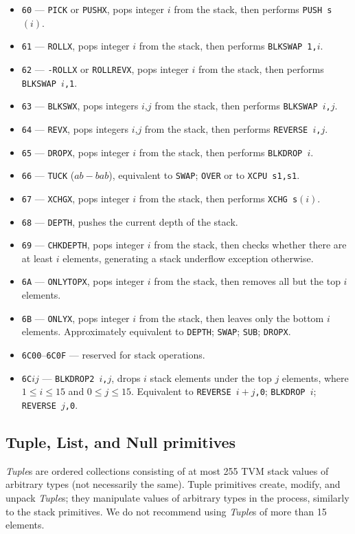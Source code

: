 \documentclass[12pt,oneside]{article}
\def\mysubsection#1{\subsection{#1}\fancyhead[C]{\small{\textsc{\textrm{\thesubsection.} #1}}}}
\begin{document}
\begin{itemize}
\item {\tt 60} --- {\tt PICK} or {\tt PUSHX}, pops integer $i$ from the stack, then performs {\tt PUSH s$(i)$}.
\item {\tt 61} --- {\tt ROLLX}, pops integer $i$ from the stack, then performs {\tt BLKSWAP 1,$i$}.
\item {\tt 62} --- {\tt -ROLLX} or {\tt ROLLREVX}, pops integer $i$ from the stack, then performs {\tt BLKSWAP $i$,1}.
\item {\tt 63} --- {\tt BLKSWX}, pops integers $i$,$j$ from the stack, then performs {\tt BLKSWAP $i$,$j$}.
\item {\tt 64} --- {\tt REVX}, pops integers $i$,$j$ from the stack, then performs {\tt REVERSE $i$,$j$}.
\item {\tt 65} --- {\tt DROPX}, pops integer $i$ from the stack, then performs {\tt BLKDROP $i$}.
\item {\tt 66} --- {\tt TUCK} ($a b - b a b$), equivalent to {\tt SWAP}; {\tt OVER} or to {\tt XCPU s1,s1}.
\item {\tt 67} --- {\tt XCHGX}, pops integer $i$ from the stack, then performs {\tt XCHG s$(i)$}.
\item {\tt 68} --- {\tt DEPTH}, pushes the current depth of the stack.
\item {\tt 69} --- {\tt CHKDEPTH}, pops integer $i$ from the stack, then checks whether there are at least $i$ elements, generating a stack underflow exception otherwise.
\item {\tt 6A} --- {\tt ONLYTOPX}, pops integer $i$ from the stack, then removes all but the top $i$ elements.
\item {\tt 6B} --- {\tt ONLYX}, pops integer $i$ from the stack, then leaves only the bottom $i$ elements. Approximately equivalent to {\tt DEPTH}; {\tt SWAP}; {\tt SUB}; {\tt DROPX}.
\item {\tt 6C00}--{\tt 6C0F} --- reserved for stack operations.
\item {\tt 6C$ij$} --- {\tt BLKDROP2 $i$,$j$}, drops $i$ stack elements under the top $j$ elements, where $1\leq i\leq15$ and $0\leq j\leq 15$. Equivalent to {\tt REVERSE $i+j$,0}; {\tt BLKDROP $i$}; {\tt REVERSE $j$,0}.
\end{itemize}

\mysubsection{Tuple, List, and Null primitives}

{\em Tuple\/}s are ordered collections consisting of at most 255 TVM stack values of arbitrary types (not necessarily the same). Tuple primitives create, modify, and unpack {\em Tuple\/}s; they manipulate values of arbitrary types in the process, similarly to the stack primitives. We do not recommend using {\em Tuple\/}s of more than 15 elements.
\end{document}
